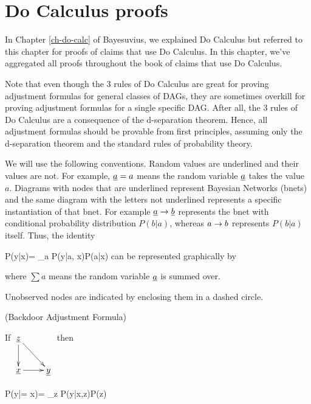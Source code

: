 \chapter{Do Calculus proofs}
\label{ch-do-calc-proofs}

In Chapter \ref{ch-do-calc}
of Bayesuvius,
we explained Do Calculus
but referred to this
chapter for proofs 
of claims that 
use Do Calculus.
In this chapter, we've 
aggregated
 all proofs 
throughout the book
of claims that use Do Calculus.

Note that even though the 3
rules of Do Calculus
are great for proving 
adjustment formulas
for general classes of DAGs,
they are sometimes overkill
for proving
 adjustment formulas
for a single specific DAG.
After all,  the
 3 rules of Do Calculus
are a consequence
of the d-separation theorem.
Hence, all adjustment 
formulas should be
provable from first principles,
assuming only
the d-separation theorem
and the standard rules of
probability theory.

We will use the
 following conventions.
Random values are underlined
and their values are not.
For example, ${\underline{a}}=a$ means 
the random variable
${\underline{a}}$ takes the value $a$.
Diagrams 
with nodes that are 
underlined represent 
Bayesian Networks (bnets)
and the same diagram 
with the letters not underlined
represents a specific
instantiation of that bnet.
For example ${\underline{a}}\rightarrow{\underline{b}}$
represents the bnet with 
conditional probability distribution
$P(b|a)$,
whereas  $a\rightarrow b$
represents $P(b|a)$ itself.
Thus, the identity

\beq
P(y|x)= \sum_a P(y|a, x)P(a|x)
\eeq
can be represented graphically
by

\beq
{}
\eeq
where $\sum a$
means the random variable
${\underline{a}}$ is summed over.

Unobserved nodes are 
indicated by enclosing them
in a dashed circle.

\begin{claim} (Backdoor
Adjustment Formula)
\label{cl-backdoor-proof}

If 
$
\xymatrix{
{\rvz}\ar[d]\ar[rd]
\\
\rvx\ar[r]&\rvy
}$
then

\beq
P(y|\cald \rvx = x)=
\sum_z
P(y|x,z)P(z)
\eeq
\beq
{}
\eeq
\end{claim}

